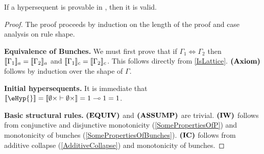 \begin{theorem}[Soundness of \OL{}]
    If a hypersequent is provable in \OL{}, then it is valid.
\end{theorem}

\begin{proof}
    The proof proceeds by induction on the length of the proof and case analysis on rule shape.
    
    \textbf{Equivalence of Bunches.}
    We must first prove that if $\Gamma_1 \Leftrightarrow \Gamma_2$ then $\llbracket \Gamma_1 \rrbracket_a = \llbracket \Gamma_2 \rrbracket_a$ and $\llbracket \Gamma_1 \rrbracket_c = \llbracket \Gamma_2 \rrbracket_c$. This follows directly from  \cref{IsLattice}. ${\normalfont \textbf{(Axiom)}}{}$ follows by induction over the shape of $\Gamma$. 

    \textbf{Initial hypersequents.} It is immediate that
    $\m{\eHyp{}} = \m{\sequentPDL{\emptyset{\times}}{\emptyset{\times}}} = 1 \ediv{} 1 = 1$.
     
    \textbf{Basic structural rules.} ${\normalfont \textbf{(EQUIV)}}$ and ${\normalfont \textbf{(ASSUMP)}}$ are trivial. ${\normalfont \textbf{(IW)}}$ follows from conjunctive and disjunctive monotonicity (\cref{SomePropertiesOfP}) and monotonicity of bunches (\cref{SomePropertiesOfBunches}). ${\normalfont \textbf{(IC)}}$ follows from additive collapse (\cref{AdditiveCollapse}) and monotonicity of bunches.


\end{proof}
